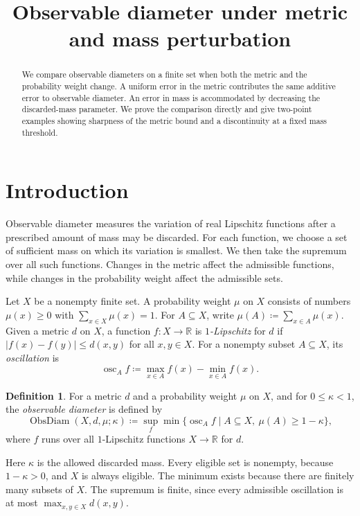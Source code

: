 \documentclass[a4paper,11pt]{article}
\title{Observable diameter under metric and mass perturbation}
\author{}
\date{}
\theoremstyle{definition}
\newtheorem{definition}[theorem]{Definition}
\DeclareMathOperator{\ObsDiam}{ObsDiam}
\DeclareMathOperator{\osc}{osc}
\begin{document}
\maketitle

\begin{abstract}
We compare observable diameters on a finite set when both the metric and the probability weight change. A uniform error in the metric contributes the same additive error to observable diameter. An error in mass is accommodated by decreasing the discarded-mass parameter. We prove the comparison directly and give two-point examples showing sharpness of the metric bound and a discontinuity at a fixed mass threshold.
\end{abstract}

\section{Introduction}

Observable diameter measures the variation of real Lipschitz functions after a prescribed amount of mass may be discarded. For each function, we choose a set of sufficient mass on which its variation is smallest. We then take the supremum over all such functions. Changes in the metric affect the admissible functions, while changes in the probability weight affect the admissible sets.

Let $X$ be a nonempty finite set. A probability weight $\mu$ on $X$ consists of numbers $\mu(x)\geq0$ with $\sum_{x\in X}\mu(x)=1$. For $A\subseteq X$, write $\mu(A)\coloneqq\sum_{x\in A}\mu(x)$. Given a metric $d$ on $X$, a function $f\colon X\to\mathbb R$ is \emph{$1$-Lipschitz} for $d$ if $|f(x)-f(y)|\leq d(x,y)$ for all $x,y\in X$. For a nonempty subset $A\subseteq X$, its \emph{oscillation} is
\[ \osc_A f\coloneqq\max_{x\in A}f(x)-\min_{x\in A}f(x). \]

\begin{definition}
For a metric $d$ and a probability weight $\mu$ on $X$, and for $0\leq\kappa<1$, the \emph{observable diameter} is defined by
\[ \ObsDiam(X,d,\mu;\kappa)\coloneqq\sup_f\min\{\osc_A f\mid A\subseteq X,\ \mu(A)\geq1-\kappa\}, \]
where $f$ runs over all $1$-Lipschitz functions $X\to\mathbb R$ for $d$.
\end{definition}

Here $\kappa$ is the allowed discarded mass. Every eligible set is nonempty, because $1-\kappa>0$, and $X$ is always eligible. The minimum exists because there are finitely many subsets of $X$. The supremum is finite, since every admissible oscillation is at most $\max_{x,y\in X}d(x,y)$.
\end{document}
